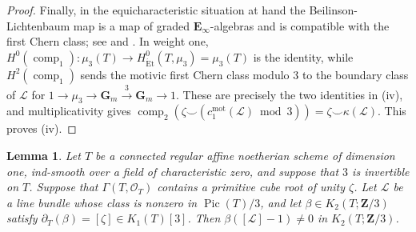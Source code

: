 \documentclass[10pt]{amsart}
\newcommand{\Et}{\mathrm{\acute{E}t}}
\DeclareMathOperator{\Pic}{Pic}
\newcommand{\mot}{\operatorname{mot}}
\newtheorem{lemma}[lemma]{Lemma}
\theoremstyle{remark}
\begin{document}
\begin{proof}
	Finally, in the equicharacteristic situation at hand the
	Beilinson-Lichtenbaum map is a map of graded
	\(\mathbf E_\infty\)-algebras and is compatible with the first Chern
	class; see
	\cite[Thm.~1.1 and Remark 4.42]{ElmantoMorrowEquicharMotivic} and
	\cite[Thm.~7.16]{BachmannElmantoMorrowCdhMotivic}. In weight one,
	\(H^0(\operatorname{comp}_1)\colon\mu_3(T)\to
	H^0_{\Et}(T,\mu_3)=\mu_3(T)\) is the identity, while
	\(H^2(\operatorname{comp}_1)\) sends the motivic first Chern class
	modulo \(3\) to the boundary class of \(\mathcal L\) for
	\(1\to\mu_3\to\mathbf G_m\xrightarrow{3}\mathbf G_m\to1\).
	These are precisely the two identities in \textup{(iv)}, and
	multiplicativity gives
	\(
	\operatorname{comp}_2
	(\zeta\smile(c_1^{\mot}(\mathcal L)\bmod3))
	=\zeta\smile\kappa(\mathcal L)
	\). This proves \textup{(iv)}.
\end{proof}

\begin{lemma}
	\label{lem:bott-picard}
	Let \(T\) be a connected regular affine noetherian scheme of dimension
	one, ind-smooth over a field of characteristic zero, and suppose that
	\(3\) is invertible on \(T\). Suppose that
	\(\Gamma(T,\mathcal O_T)\) contains a primitive cube root of unity
	\(\zeta\). Let \(\mathcal L\) be a line bundle whose class is nonzero in
	\(\Pic(T)/3\), and let \(\beta\in K_2(T;\mathbf Z/3)\) satisfy
	\(\partial_T(\beta)=[\zeta]\in K_1(T)[3]\). Then
	\(\beta([\mathcal L]-1)\ne0\) in \(K_2(T;\mathbf Z/3)\).
\end{lemma}
\end{document}
